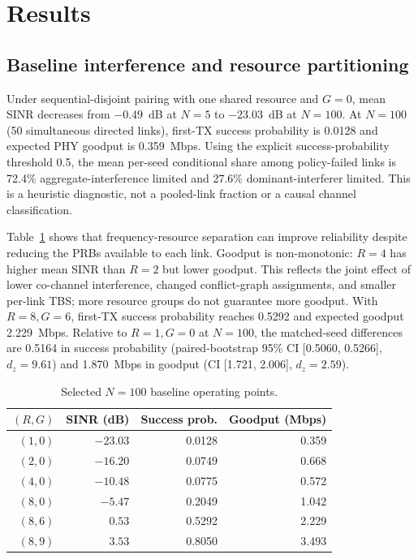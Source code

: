 \section{Results}
\subsection{Baseline interference and resource partitioning}
Under sequential-disjoint pairing with one shared resource and $G=0$, mean SINR decreases from $-0.49$~dB at $N=5$ to $-23.03$~dB at $N=100$. At $N=100$ (50 simultaneous directed links), first-TX success probability is 0.0128 and expected PHY goodput is 0.359~Mbps. Using the explicit success-probability threshold 0.5, the mean per-seed conditional share among policy-failed links is 72.4\% aggregate-interference limited and 27.6\% dominant-interferer limited. This is a heuristic diagnostic, not a pooled-link fraction or a causal channel classification.

Table~\ref{tab:n100} shows that frequency-resource separation can improve reliability despite reducing the PRBs available to each link. Goodput is non-monotonic: $R=4$ has higher mean SINR than $R=2$ but lower goodput. This reflects the joint effect of lower co-channel interference, changed conflict-graph assignments, and smaller per-link TBS; more resource groups do not guarantee more goodput. With $R=8,G=6$, first-TX success probability reaches 0.5292 and expected goodput 2.229~Mbps. Relative to $R=1,G=0$ at $N=100$, the matched-seed differences are 0.5164 in success probability (paired-bootstrap 95\% CI [0.5060, 0.5266], $d_z=9.61$) and 1.870~Mbps in goodput (CI [1.721, 2.006], $d_z=2.59$).

\begin{table}[t]
\caption{Selected $N=100$ baseline operating points.}
\label{tab:n100}
\centering
\footnotesize
\begin{tabular}{@{}rrrr@{}}
\toprule
$(R,G)$ & SINR (dB) & Success prob. & Goodput (Mbps) \\
\midrule
$(1,0)$ & $-23.03$ & 0.0128 & 0.359 \\
$(2,0)$ & $-16.20$ & 0.0749 & 0.668 \\
$(4,0)$ & $-10.48$ & 0.0775 & 0.572 \\
$(8,0)$ & $-5.47$ & 0.2049 & 1.042 \\
$(8,6)$ & $0.53$ & 0.5292 & 2.229 \\
$(8,9)$ & $3.53$ & 0.8050 & 3.493 \\
\bottomrule
\end{tabular}
\end{table}

